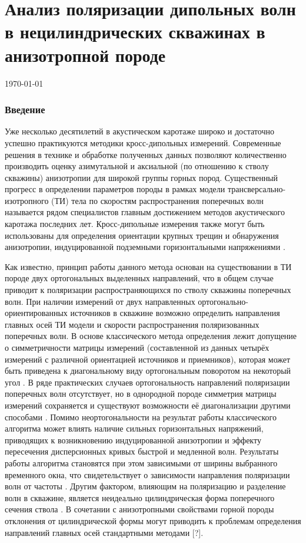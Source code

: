 \documentclass[a4paper,11pt]{article}
\begin{document}
\part*{Анализ поляризации дипольных волн в нецилиндрических скважинах в анизотропной породе}
\today

\section{Введение}
Уже несколько десятилетий в акустическом каротаже широко и достаточно успешно практикуются методики кросс-дипольных измерений. Современные решения в технике и обработке полученных данных позволяют количественно производить оценку азимутальной и аксиальной (по отношению к стволу скважины) анизотропии для широкой группы горных пород. Существенный прогресс в определении параметров породы в рамках модели трансверсально-изотропного (ТИ) тела по скоростям распространения поперечных волн называется рядом специалистов главным достижением методов акустического каротажа последних лет. Кросс-дипольные измерения также могут быть использованы для определения ориентации крупных трещин и обнаружения анизотропии, индуцированной подземными горизонтальными напряжениями \cite{Patterson2001}.

Как известно, принцип работы данного метода основан на существовании в ТИ породе двух ортогональных выделенных направлений, что в общем случае приводит к поляризации распространяющихся по стволу скважины поперечных волн. При наличии измерений от двух направленных ортогонально-ориентированных источников в скважине возможно определить направления главных осей ТИ модели и скорости распространения поляризованных поперечных волн. В основе классического метода определения лежит допущение о симметричности матрицы измерений (составленной из данных четырёх измерений с различной ориентацией источников и приемников), которая может быть приведена к диагональному виду ортогональным поворотом на некоторый угол \cite{Alford1986}. В ряде практических случаев ортогональность направлений поляризации поперечных волн отсутствует, но в однородной породе симметрия матрицы измерений сохраняется и существуют возможности её диагонализации другими способами \cite{Dellinger1998}. Помимо неортогональности на результат работы классического алгоритма может влиять наличие сильных горизонтальных напряжений, приводящих к возникновению индуцированной анизотропии и эффекту пересечения дисперсионных кривых быстрой и медленной волн. Результаты работы алгоритма становятся при этом зависимыми от ширины выбранного временного окна, что свидетельствует о зависимости направления поляризации волн от частоты \cite{Nolte1997}. Другим фактором, влияющим на поляризацию и разделение волн в скважине, является неидеально цилиндрическая форма поперечного сечения ствола \cite{Seroices2010}. В сочетании с анизотропными свойствами горной породы отклонения от цилиндрической формы могут приводить к проблемам определения направлений главных осей стандартными методами [?].
\end{document}
